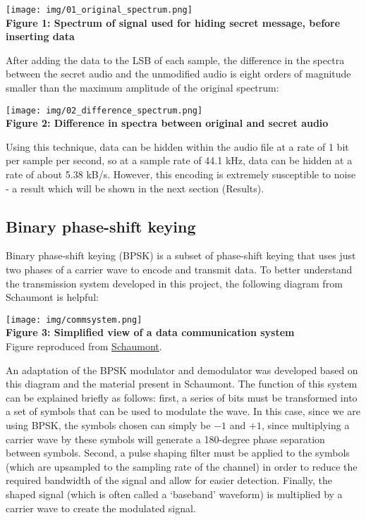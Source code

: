 \documentclass{article}
\begin{document}
\begin{center}
  \texttt{[image: img/01\_original\_spectrum.png]} \\
  \textbf{Figure 1: Spectrum of signal used for hiding secret message, before inserting data}
\end{center}

After adding the data to the LSB of each sample, the difference in the spectra
between the secret audio and the unmodified audio is eight orders of magnitude
smaller than the maximum amplitude of the original spectrum:

\begin{center}
  \texttt{[image: img/02\_difference\_spectrum.png]} \\
  \textbf{Figure 2: Difference in spectra between original and secret audio}
\end{center}

Using this technique, data can be hidden within
the audio file at a rate of 1 bit per sample per second, so at a sample rate
of 44.1 kHz, data can be hidden at a rate of about 5.38 kB/s. However, this
encoding is extremely susceptible to noise - a result which will be shown in the
next section (Results).

\subsection{Binary phase-shift keying}
Binary phase-shift keying (BPSK) is a subset of phase-shift keying that uses
just two phases of a carrier wave to encode and transmit data. To better
understand the transmission system developed in this project, the following
diagram from Schaumont is helpful:

\begin{center}
  \texttt{[image: img/commsystem.png]} \\
  \textbf{Figure 3: Simplified view of a data communication system} \\
  Figure reproduced from \href{https://schaumont.dyn.wpi.edu/ece4703b21/lecture9.html}{Schaumont}.
\end{center}

An adaptation of the BPSK modulator and demodulator was developed based on this
diagram and the material present in Schaumont. The function of this system can
be explained briefly as follows: first, a series of bits must be transformed
into a set of symbols that can be used to modulate the wave. In this case, since
we are using BPSK, the symbols chosen can simply be $-1$ and $+1$, since
multiplying a carrier wave by these symbols will generate a 180-degree phase
separation between symbols. Second, a pulse shaping filter must be applied to
the symbols (which are upsampled to the sampling rate of the channel) in order
to reduce the required bandwidth of the signal and allow for easier detection.
Finally, the shaped signal (which is often called a `baseband' waveform) is
multiplied by a carrier wave to create the modulated signal.
\end{document}
